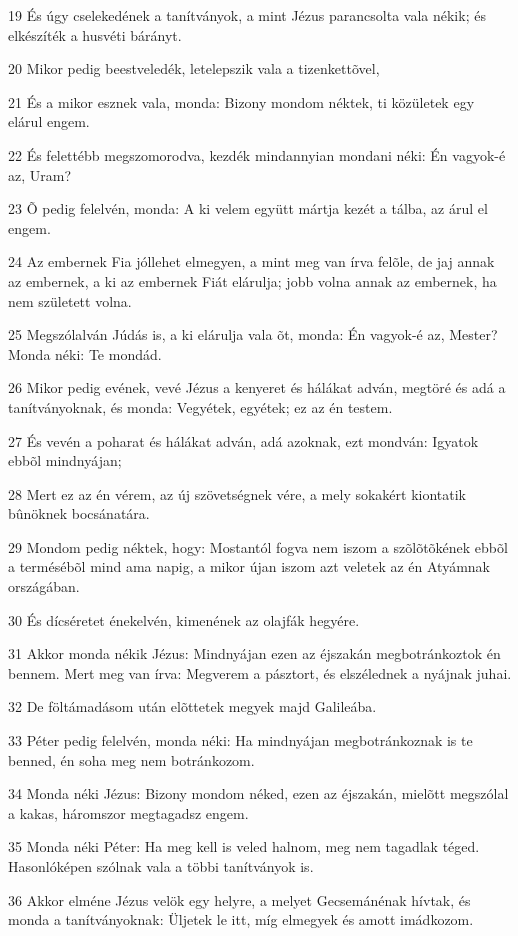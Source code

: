 \par 19 És úgy cselekedének a tanítványok, a mint Jézus parancsolta vala nékik; és elkészíték a husvéti bárányt.
\par 20 Mikor pedig beestveledék, letelepszik vala a tizenkettõvel,
\par 21 És a mikor esznek vala, monda: Bizony mondom néktek, ti közületek egy elárul engem.
\par 22 És felettébb megszomorodva, kezdék mindannyian mondani néki: Én vagyok-é az, Uram?
\par 23 Õ pedig felelvén, monda: A ki velem együtt mártja kezét a tálba, az árul el engem.
\par 24 Az embernek Fia jóllehet elmegyen, a mint meg van írva felõle, de jaj annak az embernek, a ki az embernek Fiát elárulja; jobb volna annak az embernek, ha nem született volna.
\par 25 Megszólalván Júdás is, a ki elárulja vala õt, monda: Én vagyok-é az, Mester? Monda néki: Te mondád.
\par 26 Mikor pedig evének, vevé Jézus a kenyeret és hálákat adván, megtöré és adá a tanítványoknak, és monda: Vegyétek, egyétek; ez az én testem.
\par 27 És vevén a poharat és hálákat adván, adá azoknak, ezt mondván: Igyatok ebbõl mindnyájan;
\par 28 Mert ez az én vérem, az új szövetségnek vére, a mely sokakért kiontatik bûnöknek bocsánatára.
\par 29 Mondom pedig néktek, hogy: Mostantól fogva nem iszom a szõlõtõkének ebbõl a termésébõl mind ama napig, a mikor újan iszom azt veletek az én Atyámnak országában.
\par 30 És dícséretet énekelvén,  kimenének az olajfák hegyére.
\par 31 Akkor monda nékik Jézus: Mindnyájan ezen az éjszakán megbotránkoztok én bennem. Mert meg van írva: Megverem a pásztort, és elszélednek a nyájnak juhai.
\par 32 De föltámadásom után elõttetek megyek majd Galileába.
\par 33 Péter pedig felelvén, monda néki: Ha mindnyájan megbotránkoznak is te benned, én soha meg nem botránkozom.
\par 34 Monda néki Jézus: Bizony mondom néked, ezen az éjszakán, mielõtt megszólal a kakas, háromszor megtagadsz engem.
\par 35 Monda néki Péter: Ha meg kell is veled halnom, meg nem tagadlak téged. Hasonlóképen szólnak vala a többi tanítványok is.
\par 36 Akkor elméne Jézus velök egy helyre, a melyet Gecsemánénak hívtak, és monda a tanítványoknak: Üljetek le itt, míg elmegyek és amott imádkozom.
